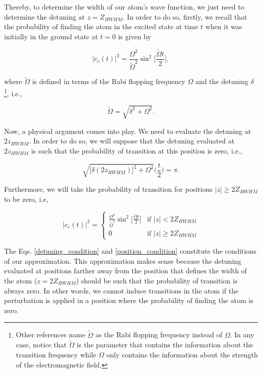 \documentclass{article}
\begin{document}
Thereby, to determine the width of our atom's wave function, we just need to determine the detuning at $z = Z_{HWHM}$. In order to do so, firstly, we recall that the probability of finding the atom in the excited state at time $t$ when it was initially in the ground state at $t=0$ is given by

\begin{equation}\label{rabi_oscillations_exact}
  |c_{e}(t)|^{2} =\frac{\Omega^{2}}{\tilde{\Omega}^{2}} \sin^{2}\bigg[\frac{\tilde{\Omega} t}{2} \bigg],
\end{equation}

where $\tilde{\Omega}$ is defined in terms of the Rabi flopping frequency $\Omega$ and the detuning $\delta$\footnote{Other references name $\tilde{\Omega}$ as the Rabi flopping frequency instead of $\Omega$. In any case, notice that $\tilde{\Omega}$ is the parameter that contains the information about the transition frequency while $\Omega$ only contains the information about the strength of the electromagnetic field.}, i.e.,

\begin{equation}
  \tilde{\Omega} = \sqrt{\delta^{2} + \Omega^{2}}.
\end{equation}

Now, a physical argument comes into play. We need to evaluate the detuning at $2z_{HWHM}$. In order to do so, we will suppose that the detuning evaluated at $2z_{HWHM}$ is such that the probability of transition at this position  is zero, i.e.,

\begin{equation}\label{detuning_condition}
\sqrt{\big[ \delta (2z_{HWHM}) \big]^{2} + \Omega^{2}} \bigg( \frac{t}{2} \bigg) = \pi.
\end{equation}

Furthermore, we will take the probability of transition for positions $|z| \ge 2 Z_{HWHM}$ to be zero, i.e,

\begin{equation}\label{position_condition}
|c_{e}(t)|^{2} =
    \begin{cases}
        \frac{\Omega^{2}}{\tilde{\Omega}^{2}} \sin^{2}\bigg[\frac{\tilde{\Omega} t}{2} \bigg] & \text{if } |z| < 2 Z_{HWHM}\\
        0 & \text{if } |z| \ge 2 Z_{HWHM}
    \end{cases}
\end{equation}

The Eqs. \ref{detuning_condition} and \ref{position_condition} constitute the conditions of our approximation. This approximation makes sense because the detuning evaluated at positions farther away from the position that defines the width of the atom ($z=2Z_{HWHM}$) should be such that the probability of transition is always zero. In other words, we cannot induce transitions in the atom if the perturbation is applied in a position where the probability of finding the atom is zero.
\end{document}
